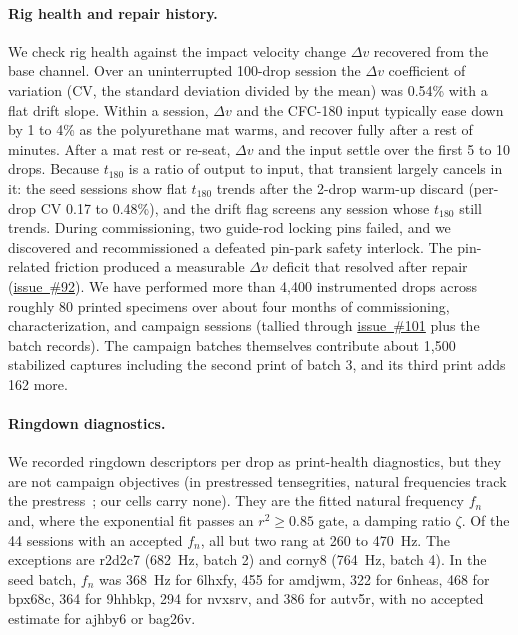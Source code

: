 \documentclass[11pt]{article}
\newcommand{\repo}{https://github.com/vertical-cloud-lab/tensegrity-optimization}
\begin{document}
\paragraph{Rig health and repair history.} We check rig health against
the impact velocity change $\Delta v$ recovered from the base channel.
Over an uninterrupted 100-drop session the $\Delta v$ coefficient of
variation (CV, the standard deviation divided by the mean) was 0.54\%
with a flat drift slope. Within a session, $\Delta v$ and the CFC-180 input
typically ease down by 1 to 4\% as the polyurethane mat warms, and
recover fully after a rest of minutes. After a mat rest or re-seat,
$\Delta v$ and the input settle over the first 5 to 10 drops. Because
$t_{180}$ is a ratio of output to input, that transient largely cancels
in it: the seed sessions show flat $t_{180}$ trends after the 2-drop
warm-up discard (per-drop CV 0.17 to 0.48\%), and the drift flag
screens any session whose $t_{180}$ still trends. During commissioning, two guide-rod locking pins
failed, and we discovered and recommissioned a defeated pin-park
safety interlock. The
pin-related friction produced a measurable $\Delta v$ deficit that resolved
after repair (\href{\repo/issues/92}{issue~\#92}). We have performed
more than 4{,}400 instrumented drops across roughly 80 printed specimens
over about four months of commissioning, characterization,
and campaign sessions (tallied through
\href{\repo/issues/101}{issue~\#101} plus the batch records). The
campaign batches themselves contribute about 1{,}500 stabilized
captures including the second print of batch 3, and its third print
adds 162 more.

\paragraph{Ringdown diagnostics.} We recorded ringdown descriptors per
drop as print-health
diagnostics, but they are not campaign
objectives (in prestressed tensegrities, natural frequencies track the prestress~\citep{ashwear2014natural}; our cells carry none). They are the fitted natural frequency $f_n$ and, where the
exponential fit passes an $r^2 \ge 0.85$ gate, a damping ratio
$\zeta$. Of the 44 sessions with an accepted $f_n$, all but two rang
at 260 to \SI{470}{Hz}. The exceptions are r2d2c7 (\SI{682}{Hz}, batch
2) and corny8 (\SI{764}{Hz}, batch 4). In the seed batch, $f_n$ was
\SI{368}{Hz} for 6lhxfy, 455 for amdjwm, 322 for 6nheas, 468 for bpx68c,
364 for 9hhbkp, 294 for nvxsrv, and 386 for autv5r, with no accepted
estimate for ajhby6 or bag26v.
\end{document}

